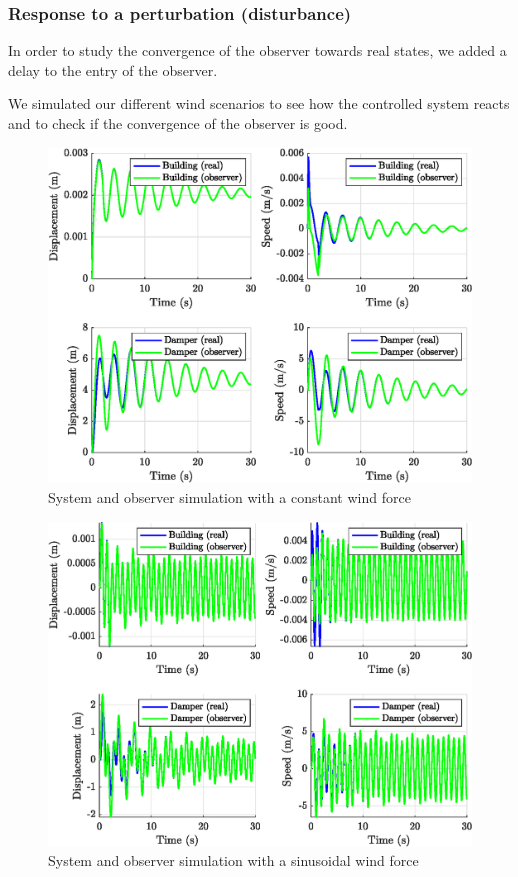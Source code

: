 \subsubsection{Response to a perturbation (disturbance)}
In order to study the convergence of the observer towards real states, we added a delay to the entry of the observer.\par
We simulated our different wind scenarios to see how the controlled system reacts and to check if the convergence of the observer is good.
\begin{figure}[H]
    \centering
    \includegraphics[width=\textwidth]{resources/eps/observer-constant.eps}
    \caption{System and observer simulation with a constant wind force}
\end{figure}
\begin{figure}[H]
    \centering
    \includegraphics[width=\textwidth]{resources/eps/observer-sinusoidal.eps}
    \caption{System and observer simulation with a sinusoidal wind force}
\end{figure}
